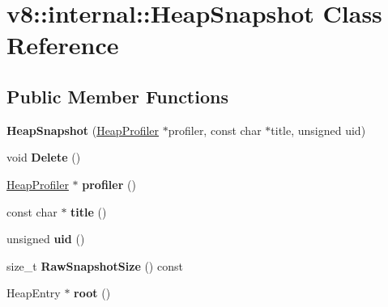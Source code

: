 \hypertarget{classv8_1_1internal_1_1_heap_snapshot}{}\section{v8\+:\+:internal\+:\+:Heap\+Snapshot Class Reference}
\label{classv8_1_1internal_1_1_heap_snapshot}
\subsection*{Public Member Functions}
\begin{DoxyCompactItemize}
\item 
\hypertarget{classv8_1_1internal_1_1_heap_snapshot_ad3f3a72a4770da0ba4cb6208aa2e4519}{}{\bfseries Heap\+Snapshot} (\hyperlink{classv8_1_1internal_1_1_heap_profiler}{Heap\+Profiler} $\ast$profiler, const char $\ast$title, unsigned uid)\label{classv8_1_1internal_1_1_heap_snapshot_ad3f3a72a4770da0ba4cb6208aa2e4519}

\item 
\hypertarget{classv8_1_1internal_1_1_heap_snapshot_a92b437132b6ad4bafb6bd8edd5815554}{}void {\bfseries Delete} ()\label{classv8_1_1internal_1_1_heap_snapshot_a92b437132b6ad4bafb6bd8edd5815554}

\item 
\hypertarget{classv8_1_1internal_1_1_heap_snapshot_a21abc3ddeb0e56eff5e0059ef45921e1}{}\hyperlink{classv8_1_1internal_1_1_heap_profiler}{Heap\+Profiler} $\ast$ {\bfseries profiler} ()\label{classv8_1_1internal_1_1_heap_snapshot_a21abc3ddeb0e56eff5e0059ef45921e1}

\item 
\hypertarget{classv8_1_1internal_1_1_heap_snapshot_ad3591790dc6f168d9500431583c7b74b}{}const char $\ast$ {\bfseries title} ()\label{classv8_1_1internal_1_1_heap_snapshot_ad3591790dc6f168d9500431583c7b74b}

\item 
\hypertarget{classv8_1_1internal_1_1_heap_snapshot_ac69688c3d25ae73c6f25e8e748568161}{}unsigned {\bfseries uid} ()\label{classv8_1_1internal_1_1_heap_snapshot_ac69688c3d25ae73c6f25e8e748568161}

\item 
\hypertarget{classv8_1_1internal_1_1_heap_snapshot_a05be198159baab66122b65c25622e1d4}{}size\+\_\+t {\bfseries Raw\+Snapshot\+Size} () const \label{classv8_1_1internal_1_1_heap_snapshot_a05be198159baab66122b65c25622e1d4}

\item 
\hypertarget{classv8_1_1internal_1_1_heap_snapshot_af1eccb69f8d539b6fe95afc6c2038319}{}Heap\+Entry $\ast$ {\bfseries root} ()\label{classv8_1_1internal_1_1_heap_snapshot_af1eccb69f8d539b6fe95afc6c2038319}


\end{DoxyCompactItemize}
